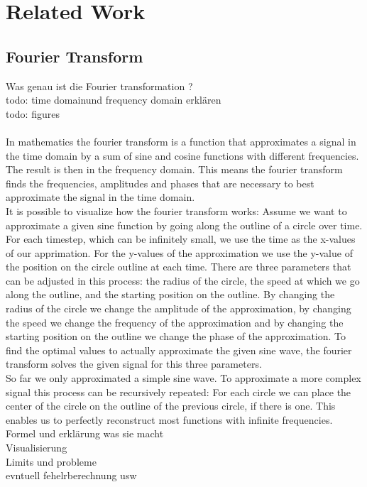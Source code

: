 \documentclass[thesis.tex]{subfiles}
\begin{document}
\chapter{Related Work}
\section{Fourier Transform}

Was genau ist die Fourier transformation ? \\
todo: time domainund frequency domain erklären \\
todo: figures \\ \\

In mathematics the fourier transform is a function that approximates a signal in the time domain by a sum of sine and cosine functions with different frequencies. The result is then in the frequency domain. This means the fourier transform finds the frequencies, amplitudes and phases that are necessary to best approximate the signal in the time domain.
\\ 
It is possible to visualize how the fourier transform works: Assume we want to approximate a given sine function by going along the outline of a circle over time. For each timestep, which can be infinitely small, we use the time as the x-values of our apprimation. For the y-values of the approximation we use the y-value of the position on the circle outline at each time. There are three parameters that can be adjusted in this process: the radius of the circle, the speed at which we go along the outline, and the starting position on the outline. By changing the radius of the circle we change the amplitude of the approximation, by changing the speed we change the frequency of the approximation and by changing the starting position on the outline we change the phase of the approximation. To find the optimal values to actually approximate the given sine wave, the fourier transform solves the given signal for this three parameters.
\\ So far we only approximated a simple sine wave. To approximate a more complex signal this process can be recursively repeated: For each circle we can place the center of the circle on the outline of the previous circle, if there is one. This enables us to perfectly reconstruct most functions with infinite frequencies. 
\\



Formel und erklärung was sie macht \\
Visualisierung \\
Limits und probleme \\
evntuell fehelrberechnung usw
\end{document}
